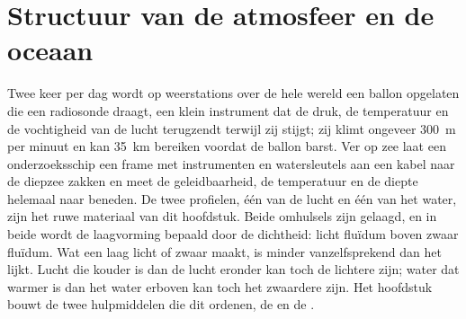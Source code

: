 \chapter{Structuur van de atmosfeer en de oceaan}\label{ch:b1:fluid-envelopes-structure}

Twee keer per dag wordt op weerstations over de hele wereld een ballon opgelaten die een radiosonde draagt, een klein instrument dat de druk, de temperatuur en de vochtigheid van de lucht terugzendt terwijl zij stijgt; zij klimt ongeveer \qty{300}{m} per minuut en kan \qty{35}{km} bereiken voordat de ballon barst. Ver op zee laat een onderzoeksschip een frame met instrumenten en watersleutels aan een kabel naar de diepzee zakken en meet de geleidbaarheid, de temperatuur en de diepte helemaal naar beneden. De twee profielen, één van de lucht en één van het water, zijn het ruwe materiaal van dit hoofdstuk. Beide omhulsels zijn gelaagd, en in beide wordt de laagvorming bepaald door de dichtheid: licht fluïdum boven zwaar fluïdum. Wat een laag licht of zwaar maakt, is minder vanzelfsprekend dan het lijkt. Lucht die kouder is dan de lucht eronder kan toch de lichtere zijn; water dat warmer is dan het water erboven kan toch het zwaardere zijn. Het hoofdstuk bouwt de twee hulpmiddelen die dit ordenen, de  en de .

